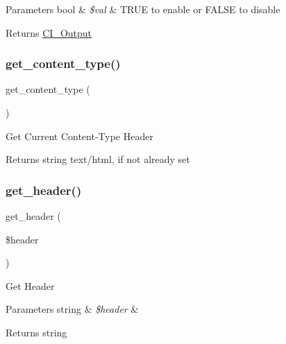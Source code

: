 \begin{DoxyParams}[1]{Parameters}
bool & {\em \$val} & T\+R\+UE to enable or F\+A\+L\+SE to disable \\
\hline
\end{DoxyParams}
\begin{DoxyReturn}{Returns}
\mbox{\hyperlink{class_c_i___output}{C\+I\+\_\+\+Output}} 
\end{DoxyReturn}
\mbox{\label{class_c_i___output_a4d8c59d65c47c9146dbc1c7d0c4eccf2}} 
\subsubsection{\texorpdfstring{get\+\_\+content\+\_\+type()}{get\_content\_type()}}
{\footnotesize\ttfamily get\+\_\+content\+\_\+type (\begin{DoxyParamCaption}{ }\end{DoxyParamCaption})}

Get Current Content-\/\+Type Header

\begin{DoxyReturn}{Returns}
string \textquotesingle{}text/html\textquotesingle{}, if not already set 
\end{DoxyReturn}
\mbox{\label{class_c_i___output_afc84ca7f4f93817160ea738f2f899a74}} 
\subsubsection{\texorpdfstring{get\+\_\+header()}{get\_header()}}
{\footnotesize\ttfamily get\+\_\+header (\begin{DoxyParamCaption}\item[{}]{\$header }\end{DoxyParamCaption})}

Get Header


\begin{DoxyParams}[1]{Parameters}
string & {\em \$header} & \\
\hline
\end{DoxyParams}
\begin{DoxyReturn}{Returns}
string 
\end{DoxyReturn}
\mbox{\label{class_c_i___output_aa6c3f8688f804de4f1af8a462fffb922}} 
